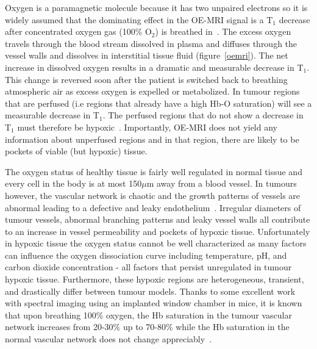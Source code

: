 Oxygen is a paramagnetic molecule because it has two unpaired electrons so it is widely assumed that the dominating effect in the OE-MRI signal is a T$_1$ decrease after concentrated oxygen gas (100\% O$_2$) is breathed in~\cite{OConnor:2016ee,Linnik:2013hf}. 
The excess oxygen travels through the blood stream dissolved in plasma and diffuses through the vessel walls and dissolves in interstitial tissue fluid (figure~\ref{oemri}).
The net increase in dissolved oxygen results in a dramatic and measurable decrease in T$_1$. 
This change is reversed soon after the patient is switched back to breathing atmospheric air as excess oxygen is expelled or metabolized. 
In tumour regions that are perfused (i.e regions that already have a high \acs{Hb}-O saturation) will see a measurable decrease in T$_1$. 
The perfused regions that do not show a decrease in T$_1$ must therefore be hypoxic~\cite{OConnor:2016ee}. 
Importantly, OE-MRI does not yield any information about unperfused regions and in that region, there are likely to be pockets of viable (but hypoxic) tissue.

The oxygen status of healthy tissue is fairly well regulated in normal tissue and every cell in the body is at most 150$\mu$m away from a blood vessel. 
In tumours however, the vascular network is chaotic and the growth patterns of vessels are abnormal leading to a defective and leaky endothelium~\cite{McDonald:2002ut}. 
Irregular diameters of tumour vessels, abnormal branching patterns and leaky vessel walls all contribute to an increase in vessel permeability and pockets of hypoxic tissue. 
Unfortunately in hypoxic tissue the oxygen status cannot be well characterized as many factors can influence the oxygen dissociation curve including temperature, pH, and carbon dioxide concentration - all factors that persist unregulated in tumour hypoxic tissue. 
Furthermore, these hypoxic regions are heterogeneous, transient, and drastically differ between tumour models. 
Thanks to some excellent work with spectral imaging using an implanted window chamber in mice, it is known that upon breathing 100\% oxygen, the \acs{Hb} saturation in the tumour vascular network increases from 20-30\% up to 70-80\% while the \acs{Hb} saturation in the normal vascular network does not change appreciably~\cite{Sorg:2008eg}.

